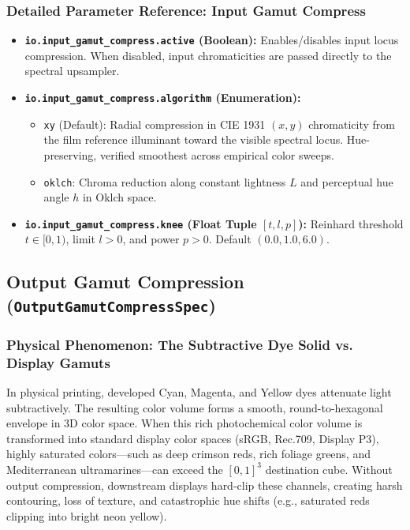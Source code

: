 \documentclass[11pt,a4paper]{article}
\begin{document}
\subsubsection{Detailed Parameter Reference: Input Gamut Compress}
\begin{itemize}[leftmargin=*]
    \item \textbf{\texttt{io.input\_gamut\_compress.active} (Boolean):}
    Enables/disables input locus compression. When disabled, input chromaticities are passed directly to the spectral upsampler.
    \item \textbf{\texttt{io.input\_gamut\_compress.algorithm} (Enumeration):}
    \begin{itemize}
        \item \texttt{xy} (Default): Radial compression in CIE 1931 $(x, y)$ chromaticity from the film reference illuminant toward the visible spectral locus. Hue-preserving, verified smoothest across empirical color sweeps.
        \item \texttt{oklch}: Chroma reduction along constant lightness $L$ and perceptual hue angle $h$ in Oklch space.
    \end{itemize}
    \item \textbf{\texttt{io.input\_gamut\_compress.knee} (Float Tuple $[t, l, p]$):}
    Reinhard threshold $t \in [0, 1)$, limit $l > 0$, and power $p > 0$. Default $(0.0, 1.0, 6.0)$.
\end{itemize}

\subsection{Output Gamut Compression (\texttt{OutputGamutCompressSpec})}

\subsubsection{Physical Phenomenon: The Subtractive Dye Solid vs. Display Gamuts}
In physical printing, developed Cyan, Magenta, and Yellow dyes attenuate light subtractively. The resulting color volume forms a smooth, round-to-hexagonal envelope in 3D color space. When this rich photochemical color volume is transformed into standard display color spaces (sRGB, Rec.709, Display P3), highly saturated colors—such as deep crimson reds, rich foliage greens, and Mediterranean ultramarines—can exceed the $[0, 1]^3$ destination cube.
Without output compression, downstream displays hard-clip these channels, creating harsh contouring, loss of texture, and catastrophic hue shifts (e.g., saturated reds clipping into bright neon yellow).
\end{document}
